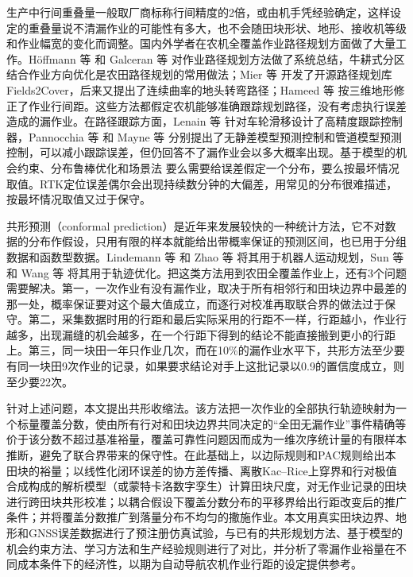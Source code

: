 \documentclass[preprint,12pt,number,sort&compress]{elsarticle}
\begin{document}
生产中行间重叠量一般取厂商标称行间精度的2倍，或由机手凭经验确定，这样设定的重叠量说不清漏作业的可能性有多大，也不会随田块形状、地形、接收机等级和作业幅宽的变化而调整。国内外学者在农机全覆盖作业路径规划方面做了大量工作。Höffmann 等\citep{hoffmann2024} 和 Galceran 等\citep{galceran2013} 对作业路径规划方法做了系统总结，牛耕式分区结合作业方向优化是农田路径规划的常用做法；Mier 等\citep{mier2023} 开发了开源路径规划库Fields2Cover，后来又提出了连续曲率的地头转弯路径\citep{mier2025}；Hameed 等\citep{hameed2016} 按三维地形修正了作业行间距。这些方法都假定农机能够准确跟踪规划路径，没有考虑执行误差造成的漏作业。在路径跟踪方面，Lenain 等\citep{lenain2006} 针对车轮滑移设计了高精度跟踪控制器，Pannocchia 等\citep{pannocchia2003} 和 Mayne 等\citep{mayne2005} 分别提出了无静差模型预测控制和管道模型预测控制，可以减小跟踪误差，但仍回答不了漏作业会以多大概率出现。基于模型的机会约束、分布鲁棒优化和场景法\citep{rice1944,hewing2020,mohajerin2018,campi2008} 要么需要给误差假定一个分布，要么按最坏情况取值。RTK定位误差偶尔会出现持续数分钟的大偏差，用常见的分布很难描述，按最坏情况取值又过于保守。

共形预测（conformal prediction）是近年来发展较快的一种统计方法，它不对数据的分布作假设，只用有限的样本就能给出带概率保证的预测区间\citep{vovk2012,tibshirani2019,barber2023,romano2019,angelopoulos2024crc,angelopoulos2025ltt}，也已用于分组数据和函数型数据\citep{dunn2023,lei2015,diquigiovanni2022}。Lindemann 等\citep{lindemann2023} 和 Zhao 等\citep{zhao2024} 将其用于机器人运动规划，Sun 等\citep{sun2023} 和 Wang 等\citep{wang2025} 将其用于轨迹优化。把这类方法用到农田全覆盖作业上，还有3个问题需要解决。第一，一次作业有没有漏作业，取决于所有相邻行和田块边界中最差的那一处，概率保证要对这个最大值成立，而逐行对校准再取联合界的做法过于保守。第二，采集数据时用的行距和最后实际采用的行距不一样，行距越小，作业行越多，出现漏缝的机会越多，在一个行距下得到的结论不能直接搬到更小的行距上。第三，同一块田一年只作业几次，而在10\%的漏作业水平下，共形方法至少要有同一块田9次作业的记录，如果要求结论对手上这批记录以0.9的置信度成立，则至少要22次。

针对上述问题，本文提出共形收缩法。该方法把一次作业的全部执行轨迹映射为一个标量覆盖分数，使由所有行对和田块边界共同决定的``全田无漏作业''事件精确等价于该分数不超过基准裕量，覆盖可靠性问题因而成为一维次序统计量的有限样本推断，避免了联合界带来的保守性。在此基础上，以边际规则和PAC规则给出本田块的裕量；以线性化闭环误差的协方差传播、离散Kac--Rice上穿界和行对极值合成构成的解析模型（或蒙特卡洛数字孪生）计算田块尺度，对无作业记录的田块进行跨田块共形校准；以耦合假设下覆盖分数分布的平移界给出行距改变后的推广条件；并将覆盖分数推广到落量分布不均匀的撒施作业。本文用真实田块边界、地形和GNSS误差数据进行了预注册仿真试验，与已有的共形规划方法、基于模型的机会约束方法、学习方法和生产经验规则进行了对比，并分析了零漏作业裕量在不同成本条件下的经济性，以期为自动导航农机作业行距的设定提供参考。
\end{document}
